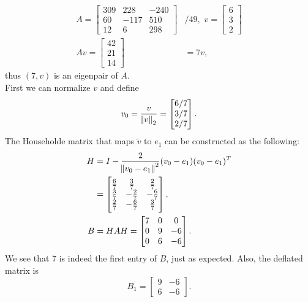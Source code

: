 \documentclass[11pt]{article}
\begin{document}
\maketitle
\section{}
\subsection{}
\begin{equation}\begin{split} 
A = \begin{bmatrix} 
309 & 228 & -240 \\
60 & -117 & 510 \\ 
12 & 6 & 298
\end{bmatrix} &/49,\,\,v = \begin{bmatrix} 6 \\ 3 \\ 2\end{bmatrix} \\
Av = \begin{bmatrix} 42 \\ 21 \\ 14 \end{bmatrix} &= 7v,
\end{split}\nonumber\end{equation}
thus $(7,v)$ is an eigenpair of $A$.\\[0,35cm]
First we can normalize $v$ and define 
$$v_0 = \frac v{\norm{v}_2} = \begin{bmatrix} 6/7 \\ 3/7 \\2/7\end{bmatrix}. $$
The Householde matrix that maps $\tilde v$ to $e_1$ can be constructed as the following:
\begin{equation}\begin{split} 
H &= I - \frac2{\norm{v_0 - e_1}^2}(v_0 - e_1)(v_0 - e_1)^T\\
&=\begin{bmatrix} 
\frac67 & \frac 37 & \frac27 \\
\frac37 & -\frac 27 & -\frac67 \\
\frac27 & -\frac67 & \frac37
\end{bmatrix},\\
B&=HAH=\begin{bmatrix} 
7 & 0 & 0 \\
0 & 9 & -6 \\
0 & 6 & -6
\end{bmatrix}.
\end{split}\nonumber\end{equation}
We see that 7 is indeed the first entry of $B$, just as expected. Also, the deflated matrix is
$$B_1 = \begin{bmatrix}9 & -6\\6 & -6 \end{bmatrix}.$$
\end{document}
